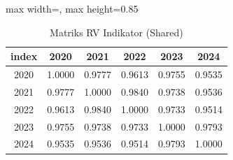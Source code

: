 \begin{table}[H]
\centering
\caption{Matriks RV Indikator (Shared)} \label{tab:apprv_s}
\begin{adjustbox}{max width=\textwidth, max height=0.85\textheight}
\begin{tabular}{|c|c|c|c|c|c|}
\hline
\textbf{index} & \textbf{2020} & \textbf{2021} & \textbf{2022} & \textbf{2023} & \textbf{2024} \\
\hline
2020 & 1.0000 & 0.9777 & 0.9613 & 0.9755 & 0.9535 \\
2021 & 0.9777 & 1.0000 & 0.9840 & 0.9738 & 0.9536 \\
2022 & 0.9613 & 0.9840 & 1.0000 & 0.9733 & 0.9514 \\
2023 & 0.9755 & 0.9738 & 0.9733 & 1.0000 & 0.9793 \\
2024 & 0.9535 & 0.9536 & 0.9514 & 0.9793 & 1.0000 \\
\hline
\end{tabular}
\end{adjustbox}
\end{table}